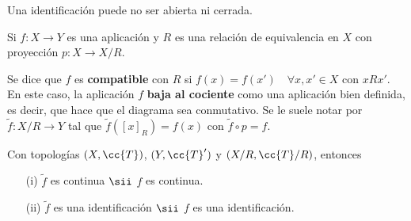 \begin{observacion}
    Una identificación puede no ser abierta ni cerrada.
    \endsquare
\end{observacion}


\begin{definicion}
    Si $f:X \to Y$ es una aplicación y $R$ es una relación de equivalencia en $X$ con proyección $p:X \to X/R$.

    \begin{figure}[H]
        \centering
    \end{figure}
    

    Se dice que $f$ es \textbf{compatible} con $R$ si $f(x)=f(x')$\ \ $\forall x, x' \in X$ con $xRx'$. En este caso, la aplicación $f$ \textbf{baja al cociente} como una aplicación bien definida, es decir, que hace que el diagrama sea conmutativo. Se le suele notar por $\tilde{f}:X/R \to Y$ tal que $\tilde{f}([x]_R)=f(x)$ con $\tilde{f}\circ p = f$.
    \endsquare
\end{definicion}

\begin{coro}
    Con topologías $(X, \cc{T})$, $(Y, \cc{T}')$ y $(X/R, \cc{T}/R)$, entonces 
    \begin{enumerate}
        \item[(i)] $\tilde{f}$ es continua $\sii$ $f$ es continua.
        \item[(ii)] $\tilde{f}$ es una identificación $\sii$ $f$ es una identificación.
    \end{enumerate}
    \endsquare
\end{coro}

